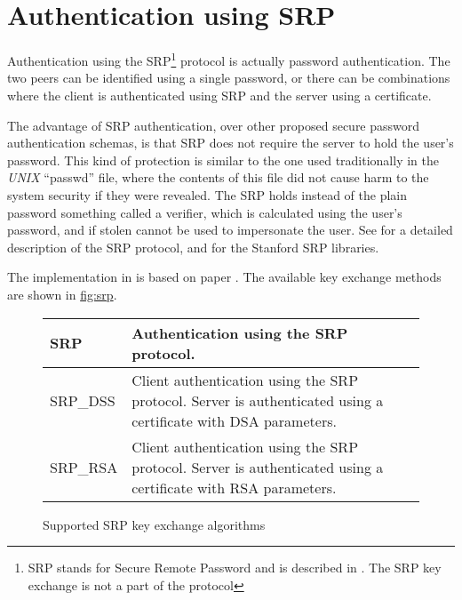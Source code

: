 \section{Authentication using SRP}

Authentication using the SRP\footnote{SRP stands for Secure Remote Password and 
is described in \cite{RFC2945}. The SRP key exchange is not a part of the \tlsI{} protocol}
protocol is actually password authentication. The two peers can be identified using a
single password, or there can be combinations where the client is 
authenticated using SRP and the server using a certificate.
\par
The advantage of SRP authentication, over other proposed secure password 
authentication schemas, is that SRP does not require the server to hold
the user's password. This kind of protection is similar to the one used traditionally
in the \emph{UNIX} ``passwd'' file, where the contents of this file did not cause
harm to the system security if they were revealed.
The SRP holds instead of the plain password something called a verifier, 
which is calculated using the user's password, and if stolen cannot
be used to impersonate the user. See \cite{TOMSRP} for a detailed description
of the SRP protocol, and for the Stanford SRP libraries.

\par
The implementation in \gnutls{} is based on paper \cite{TLSSRP}.
The available key exchange methods are shown in \hyperref{figure}{figure }{}{fig:srp}.

\begin{figure}[hbtp]
\begin{tabular}{|l|p{9cm}|}

\hline
SRP & Authentication using the SRP protocol. 
\\
\hline
SRP\_DSS & Client authentication using the SRP protocol. Server is 
authenticated using a certificate with DSA parameters.
\\
\hline
SRP\_RSA & Client authentication using the SRP protocol. Server is 
authenticated using a certificate with RSA parameters.
\\
\hline
\end{tabular}

\caption{Supported SRP key exchange algorithms}
\label{fig:srp}

\end{figure}

